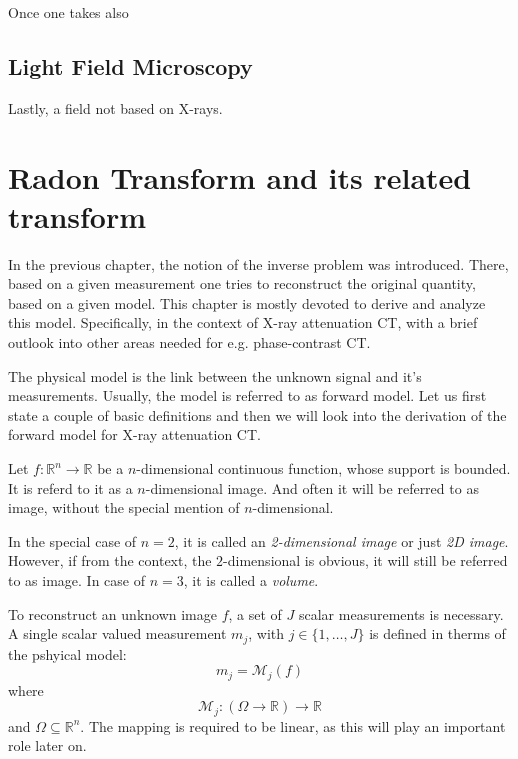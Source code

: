 Once one takes also

\section{Light Field Microscopy}

Lastly, a field not based on X-rays.


\chapter{Radon Transform and its related transform}

In the previous chapter, the notion of the inverse problem was introduced. There, based on a given
measurement one tries to reconstruct the original quantity, based on a given model. This chapter is
mostly devoted to derive and analyze this model. Specifically, in the context of X-ray attenuation
CT, with a brief outlook into other areas needed for e.g. phase-contrast CT.

The physical model is the link between the unknown signal and it's measurements. Usually, the model
is referred to as forward model. Let us first state a couple of basic definitions and then we will
look into the derivation of the forward model for X-ray attenuation CT.

\begin{definition}[Image]\label{def:image}
	Let \(f\colon \mathbb{R}^n \to \mathbb{R}\) be a \(n\)-dimensional continuous function, whose support is
	bounded. It is referd to it as a \(n\)-dimensional image. And often it will be referred to as image,
	without the special mention of \(n\)-dimensional.
\end{definition}


In the special case of \(n=2\), it is called an \textit{2-dimensional image} or just
\textit{2D image}. However, if from the context, the \(2\)-dimensional is obvious, it will still be
referred to as image. In case of \(n=3\), it is called a \textit{volume}.

\begin{definition}\label{def:forward-model}
	To reconstruct an unknown image \(f\), a set of \(J\) scalar measurements is necessary.
	A single scalar valued measurement \(m_j\), with \(j \in \{1, \dots, J\}\) is defined in therms
	of the pshyical model:
	\[ m_j = \mathscr{M}_j(f)\]
	where
	\[ \mathscr{M}_j\colon (\Omega \to \mathbb{R}) \to \mathbb{R} \]
	and \(\Omega \subseteq \mathbb{R}^n\). The mapping is required to be linear, as this will play an
	important role later on.
\end{definition}

